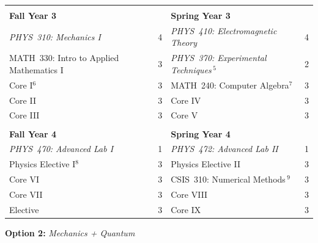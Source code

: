 \documentclass[12pt]{article}
\begin{document}
\begin{table}[h!]
\begin{center}
{\renewcommand{\arraystretch}{1.2}
\begin{tabular*}{0.9\textwidth}{@{\extracolsep{\fill}}lclc} 
& \\
{\Large \textbf{Fall Year 3}} & & {\Large \textbf{Spring Year 3}} & \\
\hline
{\em PHYS~310: Mechanics I}         		& 4 & {\em PHYS~410: Electromagnetic Theory } 			& 4  \\
MATH~330: Intro to Applied Mathematics I 	& 3 & {\em PHYS~370: Experimental Techniques}\,$^{5}$ 	& 2 \\
Core I$^{6}$ 								& 3 & MATH~240: Computer Algebra$^{7}$    				& 3 \\
Core II 									& 3 & Core IV 											&3  \\
Core III 									& 3 & Core V 											&3  \\

 & \\
 
{\Large \textbf{Fall Year 4}} & & {\Large \textbf{Spring Year 4}} & \\
\hline
{\em PHYS~470: Advanced Lab I} 				& 1 & {\em PHYS~472: Advanced Lab II}  					& 1 \\
Physics Elective I$^{8}$ 					& 3 & Physics Elective II    							& 3 \\
Core VI 									& 3 & CSIS~310: Numerical Methods\,$^{9}$   			& 3 \\
Core VII                       				& 3 & Core VIII              							& 3 \\
Elective                       				& 3 & Core IX                 							& 3 \\
\hline
\end{tabular*}
}
\end{center}
\end{table}



\begin{center}
{ \Large \textbf {Option 2:} {\em Mechanics + Quantum}}
\end{center}
\end{document}
